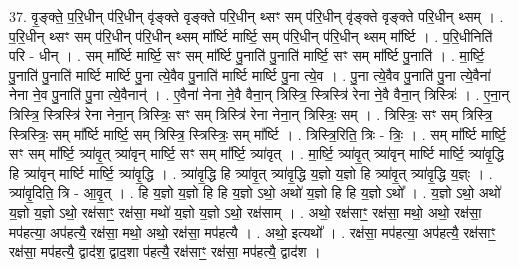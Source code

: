 \documentclass[17pt]{extarticle}
\begin{document}
37. वृ॒ङ्क्ते॒ प॒रि॒धीन् प॑रि॒धीन् वृ॑ङ्क्ते वृङ्क्ते परि॒धीन् थ्सꣳ सम् प॑रि॒धीन् वृ॑ङ्क्ते वृङ्क्ते परि॒धीन् थ्सम् । . प॒रि॒धीन् थ्सꣳ सम् प॑रि॒धीन् प॑रि॒धीन् थ्सम् मा᳚र्ष्टि मार्ष्टि॒ सम् प॑रि॒धीन् प॑रि॒धीन् थ्सम् मा᳚र्ष्टि । . प॒रि॒धीनिति॑ परि - धीन् । . सम् मा᳚र्ष्टि मार्ष्टि॒ सꣳ सम् मा᳚र्ष्टि पु॒नाति॑ पु॒नाति॑ मार्ष्टि॒ सꣳ सम् मा᳚र्ष्टि पु॒नाति॑ । . मा॒र्ष्टि॒ पु॒नाति॑ पु॒नाति॑ मार्ष्टि मार्ष्टि पु॒ना त्ये॒वैव पु॒नाति॑ मार्ष्टि मार्ष्टि पु॒ना त्ये॒व । . पु॒ना त्ये॒वैव पु॒नाति॑ पु॒ना त्ये॒वैना॑ नेना ने॒व पु॒नाति॑ पु॒ना त्ये॒वैनान्॑ । . ए॒वैना॑ नेना ने॒वै वैना॒न् त्रिस्त्रि॒ स्त्रिस्त्रि॑ रेना ने॒वै वैना॒न् त्रिस्त्रिः॑ । . ए॒ना॒न् त्रिस्त्रि॒ स्त्रिस्त्रि॑ रेना नेना॒न् त्रिस्त्रिः॒ सꣳ सम् त्रिस्त्रि॑ रेना नेना॒न् त्रिस्त्रिः॒ सम् । . त्रिस्त्रिः॒ सꣳ सम् त्रिस्त्रि॒ स्त्रिस्त्रिः॒ सम् मा᳚र्ष्टि मार्ष्टि॒ सम् त्रिस्त्रि॒ स्त्रिस्त्रिः॒ सम् मा᳚र्ष्टि । . त्रिस्त्रि॒रिति॒ त्रिः - त्रिः॒ । . सम् मा᳚र्ष्टि मार्ष्टि॒ सꣳ सम् मा᳚र्ष्टि॒ त्र्या॑वृ॒त् त्र्या॑वृन् मार्ष्टि॒ सꣳ सम् मा᳚र्ष्टि॒ त्र्या॑वृत् । . मा॒र्ष्टि॒ त्र्या॑वृ॒त् त्र्या॑वृन् मार्ष्टि मार्ष्टि॒ त्र्या॑वृ॒द्धि हि त्र्या॑वृन् मार्ष्टि मार्ष्टि॒ त्र्या॑वृ॒द्धि । . त्र्या॑वृ॒द्धि हि त्र्या॑वृ॒त् त्र्या॑वृ॒द्धि य॒ज्ञो य॒ज्ञो हि त्र्या॑वृ॒त् त्र्या॑वृ॒द्धि य॒ज्ञ्ः । . त्र्या॑वृ॒दिति॒ त्रि - आ॒वृ॒त् । . हि य॒ज्ञो य॒ज्ञो हि हि य॒ज्ञो ऽथो॒ अथो॑ य॒ज्ञो हि हि य॒ज्ञो ऽथो᳚ । . य॒ज्ञो ऽथो॒ अथो॑ य॒ज्ञो य॒ज्ञो ऽथो॒ रक्ष॑साꣳ॒॒ रक्ष॑सा॒ मथो॑ य॒ज्ञो य॒ज्ञो ऽथो॒ रक्ष॑साम् । . अथो॒ रक्ष॑साꣳ॒॒ रक्ष॑सा॒ मथो॒ अथो॒ रक्ष॑सा॒ मप॑हत्या॒ अप॑हत्यै॒ रक्ष॑सा॒ मथो॒ अथो॒ रक्ष॑सा॒ मप॑हत्यै । . अथो॒ इत्यथो᳚ । . रक्ष॑सा॒ मप॑हत्या॒ अप॑हत्यै॒ रक्ष॑साꣳ॒॒ रक्ष॑सा॒ मप॑हत्यै॒ द्वाद॑श॒ द्वाद॒शा प॑हत्यै॒ रक्ष॑साꣳ॒॒ रक्ष॑सा॒ मप॑हत्यै॒ द्वाद॑श । \newline
\end{document}
